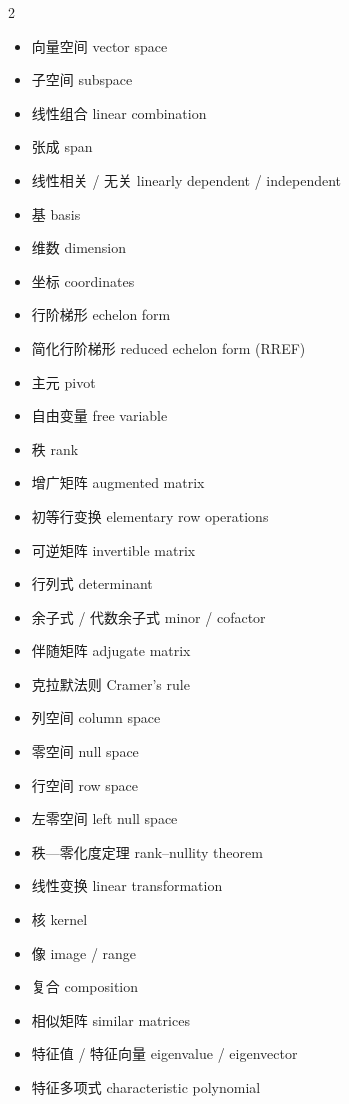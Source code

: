\documentclass[11pt,a4paper,openany]{ctexbook}
\begin{document}
\begin{multicols}{2}
\small
{}
\begin{itemize}[leftmargin=1.2em, itemsep=1.5pt, label={}]
\item 向量空间 \hfill vector space
\item 子空间 \hfill subspace
\item 线性组合 \hfill linear combination
\item 张成 \hfill span
\item 线性相关 / 无关 \hfill linearly dependent / independent
\item 基 \hfill basis
\item 维数 \hfill dimension
\item 坐标 \hfill coordinates
\item 行阶梯形 \hfill echelon form
\item 简化行阶梯形 \hfill reduced echelon form (RREF)
\item 主元 \hfill pivot
\item 自由变量 \hfill free variable
\item 秩 \hfill rank
\item 增广矩阵 \hfill augmented matrix
\item 初等行变换 \hfill elementary row operations
\item 可逆矩阵 \hfill invertible matrix
\item 行列式 \hfill determinant
\item 余子式 / 代数余子式 \hfill minor / cofactor
\item 伴随矩阵 \hfill adjugate matrix
\item 克拉默法则 \hfill Cramer's rule
\item 列空间 \hfill column space
\item 零空间 \hfill null space
\item 行空间 \hfill row space
\item 左零空间 \hfill left null space
\item 秩—零化度定理 \hfill rank--nullity theorem
\item 线性变换 \hfill linear transformation
\item 核 \hfill kernel
\item 像 \hfill image / range
\item 复合 \hfill composition
\item 相似矩阵 \hfill similar matrices
\item 特征值 / 特征向量 \hfill eigenvalue / eigenvector
\item 特征多项式 \hfill characteristic polynomial

\end{itemize}
\end{multicols}
\end{document}
